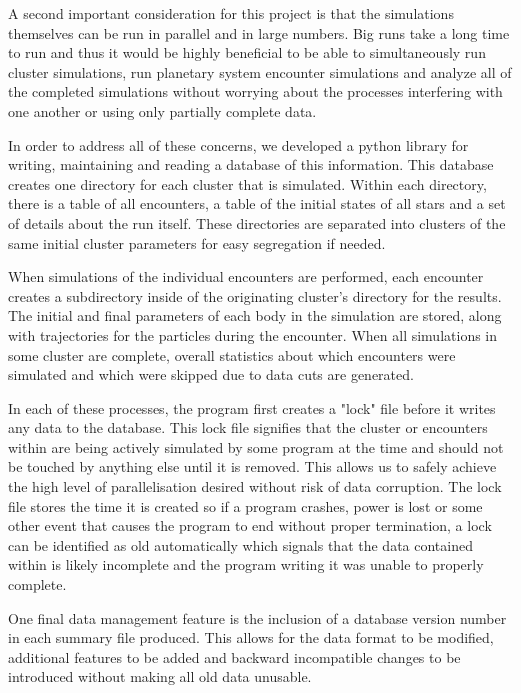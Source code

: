 \documentclass[12pt]{article}
\begin{document}
    A second important consideration for this project is that the simulations themselves
    can be run in parallel and in large numbers. Big runs take a long time to run
    and thus it would be highly beneficial to be able to simultaneously run cluster
    simulations, run planetary system encounter simulations and analyze all of the
    completed simulations without worrying about the processes interfering with one
    another or using only partially complete data.

    In order to address all of these concerns, we developed a python library 
    for writing, maintaining and reading a database of this information. This database
    creates one directory for each cluster that is simulated. Within each directory,
    there is a table of all encounters, a table of the initial states of all stars
    and a set of details about the run itself. These directories are separated
    into clusters of the same initial cluster parameters for easy segregation if needed.

    When simulations of the individual encounters are performed, each encounter
    creates a subdirectory inside of the originating cluster's directory for the 
    results. 
    The initial and final parameters of each body in the simulation are stored, along
    with trajectories for the particles during the encounter. When all simulations
    in some cluster are complete, overall statistics about which encounters were
    simulated and which were skipped due to data cuts are generated.

    In each of these processes, the program first creates a "lock" file before it
    writes any data to the database. This lock file signifies that the cluster or
    encounters within are being actively simulated by some program at the time and
    should not be touched by anything else until it is removed. This allows us to
    safely achieve the high level of parallelisation desired without risk of data
    corruption. The lock file stores the time it is created so if a program
    crashes, power is lost or some other event that causes the program to end without
    proper termination, a lock can be identified as old automatically which 
    signals that the data contained within is likely incomplete and the program
    writing it was unable to properly complete.

    One final data management feature is the inclusion of a database version number
    in each summary file produced. This allows for the data format to be modified,
    additional features to be added and backward incompatible changes to be introduced
    without making all old data unusable. 
\end{document}
